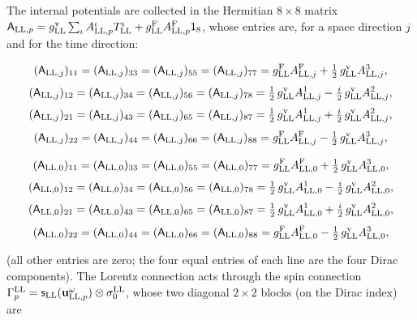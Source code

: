 \documentclass[
  10pt,
]{article}
\begin{document}
The internal potentials are collected in the Hermitian \(8\times8\)
matrix
\(\mathsf A_{{\rm LL},p}=g^{\rm v}_{\rm LL}\sum_\iota A^\iota_{{\rm LL},p}T^\iota_{\rm LL}+g^{\rm F}_{\rm LL}A^{\rm F}_{{\rm LL},p}\mathsf 1_8\),
whose entries are, for a space direction \(j\) and for the time
direction:

\[(\mathsf A_{{\rm LL},j})_{11}=(\mathsf A_{{\rm LL},j})_{33}=(\mathsf A_{{\rm LL},j})_{55}=(\mathsf A_{{\rm LL},j})_{77}=g^{\rm F}_{\rm LL}A^{\rm F}_{{\rm LL},j}+\tfrac{1}{2}\,g^{\rm v}_{\rm LL}A^{3}_{{\rm LL},j},\]
\[(\mathsf A_{{\rm LL},j})_{12}=(\mathsf A_{{\rm LL},j})_{34}=(\mathsf A_{{\rm LL},j})_{56}=(\mathsf A_{{\rm LL},j})_{78}=\tfrac{1}{2}\,g^{\rm v}_{\rm LL}A^{1}_{{\rm LL},j}-\tfrac{i}{2}\,g^{\rm v}_{\rm LL}A^{2}_{{\rm LL},j},\]
\[(\mathsf A_{{\rm LL},j})_{21}=(\mathsf A_{{\rm LL},j})_{43}=(\mathsf A_{{\rm LL},j})_{65}=(\mathsf A_{{\rm LL},j})_{87}=\tfrac{1}{2}\,g^{\rm v}_{\rm LL}A^{1}_{{\rm LL},j}+\tfrac{i}{2}\,g^{\rm v}_{\rm LL}A^{2}_{{\rm LL},j},\]
\[(\mathsf A_{{\rm LL},j})_{22}=(\mathsf A_{{\rm LL},j})_{44}=(\mathsf A_{{\rm LL},j})_{66}=(\mathsf A_{{\rm LL},j})_{88}=g^{\rm F}_{\rm LL}A^{\rm F}_{{\rm LL},j}-\tfrac{1}{2}\,g^{\rm v}_{\rm LL}A^{3}_{{\rm LL},j},\]

\[(\mathsf A_{{\rm LL},0})_{11}=(\mathsf A_{{\rm LL},0})_{33}=(\mathsf A_{{\rm LL},0})_{55}=(\mathsf A_{{\rm LL},0})_{77}=g^{\rm F}_{\rm LL}A^{\rm F}_{{\rm LL},0}+\tfrac{1}{2}\,g^{\rm v}_{\rm LL}A^{3}_{{\rm LL},0},\]
\[(\mathsf A_{{\rm LL},0})_{12}=(\mathsf A_{{\rm LL},0})_{34}=(\mathsf A_{{\rm LL},0})_{56}=(\mathsf A_{{\rm LL},0})_{78}=\tfrac{1}{2}\,g^{\rm v}_{\rm LL}A^{1}_{{\rm LL},0}-\tfrac{i}{2}\,g^{\rm v}_{\rm LL}A^{2}_{{\rm LL},0},\]
\[(\mathsf A_{{\rm LL},0})_{21}=(\mathsf A_{{\rm LL},0})_{43}=(\mathsf A_{{\rm LL},0})_{65}=(\mathsf A_{{\rm LL},0})_{87}=\tfrac{1}{2}\,g^{\rm v}_{\rm LL}A^{1}_{{\rm LL},0}+\tfrac{i}{2}\,g^{\rm v}_{\rm LL}A^{2}_{{\rm LL},0},\]
\[(\mathsf A_{{\rm LL},0})_{22}=(\mathsf A_{{\rm LL},0})_{44}=(\mathsf A_{{\rm LL},0})_{66}=(\mathsf A_{{\rm LL},0})_{88}=g^{\rm F}_{\rm LL}A^{\rm F}_{{\rm LL},0}-\tfrac{1}{2}\,g^{\rm v}_{\rm LL}A^{3}_{{\rm LL},0},\]

(all other entries are zero; the four equal entries of each line are the
four Dirac components). The Lorentz connection acts through the spin
connection
\(\Gamma^{\rm LL}_p=\mathsf s_{\rm LL}(\mathbf u^\omega_{{\rm LL},p})\otimes\sigma^{\rm LL}_0\),
whose two diagonal \(2\times2\) blocks (on the Dirac index) are
\end{document}
